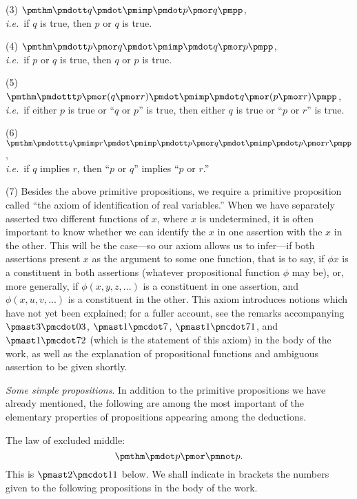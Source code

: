 \documentclass[letterpaper,12pt,openany,leqno]{book}
\newcommand{\pagefirst}[1]{\marginnote[\boxed{\text{#1}}]{\boxed{\text{#1}}}}
\begin{document}
(3) \indent $\pmthm\pmdott q \pmdot\pmimp\pmdot p \pmor q \pmpp$,\\
\textit{i.e.}\ if $q$ is true, then $p$ or $q$ is true.

(4) \indent $\pmthm\pmdott p \pmor q \pmdot\pmimp\pmdot q \pmor p \pmpp$,\\
\textit{i.e.}\ if $p$ or $q$ is true, then $q$ or $p$ is true.

(5) \indent $\pmthm\pmdottt p \pmor (q\pmor r) \pmdot\pmimp\pmdot q \pmor (p\pmor r) \pmpp$, \\
\textit{i.e.}\ if either $p$ is true or ``$q$ or $p$'' is true, then either $q$ is true or ``$p$ or $r$'' is true.

(6) \indent $\pmthm\pmdottt q \pmimp r \pmdot\pmimp\pmdott p\pmor q \pmdot\pmimp \pmdot p \pmor r \pmpp$,\\
\textit{i.e.}\ if $q$ implies $r$, then ``$p$ or $q$'' implies ``$p$ or $r$.''

(7) \indent Besides the above primitive propositions, we require a primitive proposition called ``the axiom of identification of real variables.'' When we have separately asserted two different functions of $x$, where $x$ is undetermined, it is often important to know whether we can identify the $x$ in one \pagefirst{14} assertion with the $x$ in the other. This will be the case---so our axiom allows us to infer---if both assertions present $x$ as the argument to some one function, that is to say, if $\phi x$ is a constituent in both assertions (whatever propositional function $\phi$ may be), or, more generally, if $\phi(x, y, z, ...)$ is a constituent in one assertion, and $\phi(x, u, v, ...)$ is a constituent in the other. This axiom introduces notions which have not yet been explained; for a fuller account, see the remarks accompanying $\pmast3\pmcdot03$, $\pmast1\pmcdot7$, $\pmast1\pmcdot71$, and $\pmast1\pmcdot72$ (which is the statement of this axiom) in the body of the work, as well as the explanation of propositional functions and ambiguous assertion to be given shortly.

\textit{Some simple propositions}. In addition to the primitive propositions we have already mentioned, the following are among the most important of the elementary properties of propositions appearing among the deductions.

The law of excluded middle:
\[
	\pmthm \pmdot p\pmor \pmnot p.
\]
This is $\pmast2\pmcdot11$ below. We shall indicate in brackets the numbers given to the following propositions in the body of the work.
\end{document}
